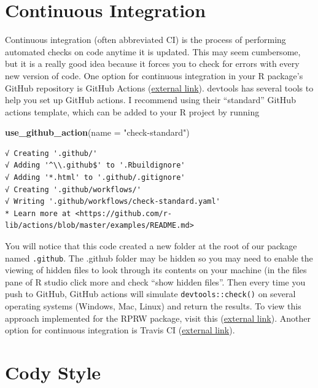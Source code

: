 \documentclass[
]{book}
\newenvironment{Shaded}{\begin{snugshade}}{\end{snugshade}}
\newcommand{\DataTypeTok}[1]{\textcolor[rgb]{0.13,0.29,0.53}{#1}}
\newcommand{\KeywordTok}[1]{\textcolor[rgb]{0.13,0.29,0.53}{\textbf{#1}}}
\newcommand{\NormalTok}[1]{#1}
\newcommand{\StringTok}[1]{\textcolor[rgb]{0.31,0.60,0.02}{#1}}
\begin{document}
\hypertarget{ci}{%
\section{Continuous Integration}\label{ci}}

Continuous integration (often abbreviated CI) is the process of performing automated checks on code anytime it is updated. This may seem cumbersome, but it is a really good idea because it forces you to check for errors with every new version of code. One option for continuous integration in your R package's GitHub repository is GitHub Actions (\href{https://github.com/features/actions}{external link}). devtools has several tools to help you set up GitHub actions. I recommend using their ``standard'' GitHub actions template, which can be added to your R project by running

\begin{Shaded}
\begin{Highlighting}[]
\KeywordTok{use_github_action}\NormalTok{(}\DataTypeTok{name =} \StringTok{"check-standard"}\NormalTok{)}
\end{Highlighting}
\end{Shaded}

\begin{verbatim}
√ Creating '.github/'
√ Adding '^\\.github$' to '.Rbuildignore'
√ Adding '*.html' to '.github/.gitignore'
√ Creating '.github/workflows/'
√ Writing '.github/workflows/check-standard.yaml'
* Learn more at <https://github.com/r-lib/actions/blob/master/examples/README.md>
\end{verbatim}

You will notice that this code created a new folder at the root of our package named \texttt{.github}. The .github folder may be hidden so you may need to enable the viewing of hidden files to look through its contents on your machine (in the files pane of R studio click more and check ``show hidden files''. Then every time you push to GitHub, GitHub actions will simulate \texttt{devtools::check()} on several operating systems (Windows, Mac, Linux) and return the results. To view this approach implemented for the RPRW package, visit this (\href{https://github.com/michaeldumelle/RPRW/actions}{external link}). Another option for continuous integration is Travis CI (\href{https://travis-ci.org/}{external link}).

\hypertarget{style}{%
\section{Cody Style}\label{style}}
\end{document}
